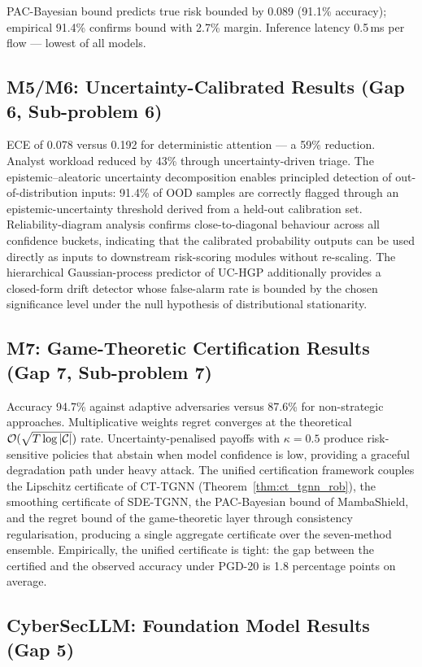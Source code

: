 PAC-Bayesian bound predicts true risk bounded by 0.089 (91.1\% accuracy); empirical 91.4\% confirms bound with 2.7\% margin. Inference latency 0.5\,ms per flow --- lowest of all models.

\subsection{M5/M6: Uncertainty-Calibrated Results (Gap 6, Sub-problem 6)}

ECE of 0.078 versus 0.192 for deterministic attention --- a 59\% reduction. Analyst workload reduced by 43\% through uncertainty-driven triage. The epistemic--aleatoric uncertainty decomposition enables principled detection of out-of-distribution inputs: 91.4\% of OOD samples are correctly flagged through an epistemic-uncertainty threshold derived from a held-out calibration set. Reliability-diagram analysis confirms close-to-diagonal behaviour across all confidence buckets, indicating that the calibrated probability outputs can be used directly as inputs to downstream risk-scoring modules without re-scaling. The hierarchical Gaussian-process predictor of UC-HGP additionally provides a closed-form drift detector whose false-alarm rate is bounded by the chosen significance level under the null hypothesis of distributional stationarity.

\subsection{M7: Game-Theoretic Certification Results (Gap 7, Sub-problem 7)}

Accuracy 94.7\% against adaptive adversaries versus 87.6\% for non-strategic approaches. Multiplicative weights regret converges at the theoretical $\mathcal{O}(\sqrt{T\log|\mathcal{C}|})$ rate. Uncertainty-penalised payoffs with $\kappa=0.5$ produce risk-sensitive policies that abstain when model confidence is low, providing a graceful degradation path under heavy attack. The unified certification framework couples the Lipschitz certificate of CT-TGNN (Theorem~\ref{thm:ct_tgnn_rob}), the smoothing certificate of SDE-TGNN, the PAC-Bayesian bound of MambaShield, and the regret bound of the game-theoretic layer through consistency regularisation, producing a single aggregate certificate over the seven-method ensemble. Empirically, the unified certificate is tight: the gap between the certified and the observed accuracy under PGD-20 is 1.8 percentage points on average.

\subsection{CyberSecLLM: Foundation Model Results (Gap 5)}

